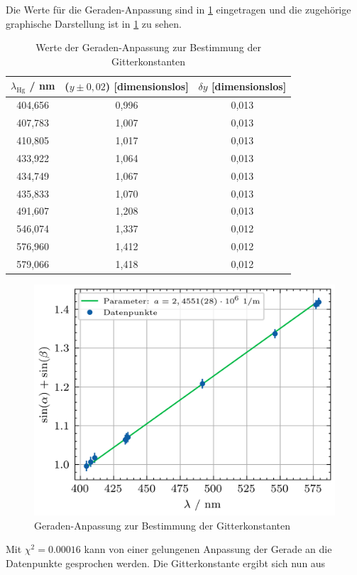 Die Werte für die Geraden-Anpassung sind in \cref{tab:geraden_fit_gitterkonstante} eingetragen und die zugehörige graphische Darstellung ist in \cref{fig:geraden_fit_gitterkonstante}
zu sehen.
\begin{table}[H]
    \centering
    \caption{Werte der Geraden-Anpassung zur Bestimmung der Gitterkonstanten}
    \begin{tabular}{c|c|c}
        $\lambda_{\mathrm{Hg}}$ / \unit{\nano \meter} & ($y \pm 0,02$) [dimensionslos] & $\delta y$ [dimensionslos] \\
        \hline
        404,656 & 0,996 & 0,013 \\
        407,783 & 1,007 & 0,013 \\
        410,805 & 1,017 & 0,013 \\
        433,922 & 1,064 & 0,013 \\
        434,749 & 1,067 & 0,013 \\
        435,833 & 1,070 & 0,013 \\
        491,607 & 1,208 & 0,013 \\
        546,074 & 1,337 & 0,012 \\
        576,960 & 1,412 & 0,012 \\
        579,066 & 1,418 & 0,012
    \end{tabular}\label{tab:geraden_fit_gitterkonstante}
\end{table}
\begin{figure}[H]
	\centering
	\includegraphics[width=0.8\linewidth]{../figs/gitterkonstante_fit.png}
	\caption{Geraden-Anpassung zur Bestimmung der Gitterkonstanten}
	\label{fig:geraden_fit_gitterkonstante}
\end{figure} Mit $\chi^2 = 0.00016$ kann von einer gelungenen Anpassung der Gerade an die Datenpunkte gesprochen werden. Die Gitterkonstante ergibt sich nun aus
